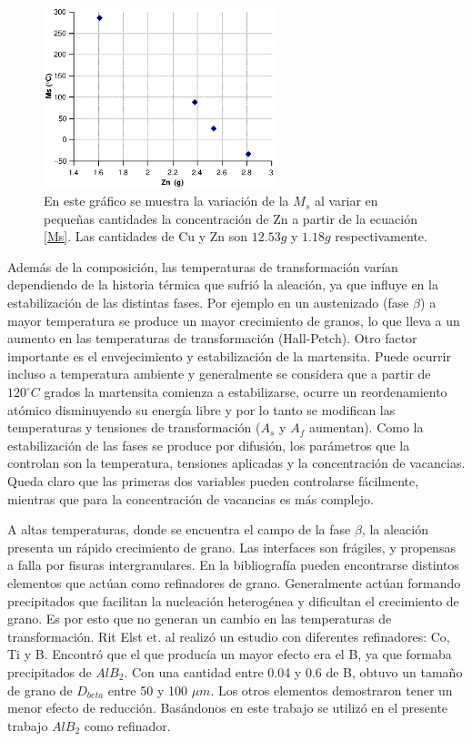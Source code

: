 \documentclass[a4paper,12pt,fleqn,twoside,openany]{book}
\begin{document}
\begin{figure}[h]
 \centering
 \includegraphics[width=0.6\textwidth]{Img/Introduccion/MsZn2.eps}
 \caption{En este gráfico se muestra la variación de la $M_s$ al variar en pequeñas cantidades la concentración de Zn a partir de la ecuación \ref{Ms}. Las cantidades de Cu y Zn son $12.53 g$ y $1.18 g$ respectivamente.}
  
\end{figure}




Además de la composición, las temperaturas de transformación varían dependiendo de la historia térmica que sufrió la aleación, ya que influye en la estabilización 
de las distintas fases. Por ejemplo en un austenizado (fase $\beta$) a mayor temperatura se produce un mayor crecimiento de granos, lo que lleva a un aumento en las 
temperaturas de transformación (Hall-Petch). Otro factor importante es el envejecimiento y estabilización de la martensita. Puede ocurrir incluso a temperatura ambiente y generalmente se considera que a partir de $120^\circ C $ grados la martensita comienza 
a estabilizarse, ocurre un reordenamiento atómico disminuyendo su energía libre y por lo tanto se modifican las temperaturas y tensiones de transformación ($A_s$ y $A_f$ aumentan). Como la estabilización 
de las fases se produce por difusión, los parámetros que la controlan son la temperatura, tensiones aplicadas y la concentración de vacancias. Queda claro que las 
primeras dos variables pueden controlarse fácilmente, mientras que para la concentración de vacancias es más complejo.

A altas temperaturas, donde se encuentra el campo de la fase $\beta$, la aleación presenta un rápido crecimiento de grano. Las interfaces son frágiles, y propensas 
a falla por fisuras intergranulares. En la bibliografía pueden encontrarse distintos elementos que actúan como refinadores de grano. Generalmente actúan formando 
precipitados que facilitan la nucleación heterogénea y dificultan el crecimiento de grano. Es por esto que no generan un cambio en las temperaturas de 
transformación. Rit Elst et. al \cite{ritelst} realizó un estudio con diferentes refinadores: Co, Ti y B. Encontró que el que producía un mayor efecto era el B, 
ya que formaba precipitados de $AlB_{2}$. Con una cantidad entre 0.04 y 0.6 de B, obtuvo un tamaño de grano de $D_{beta}$ entre 50 y 100 $\mu m$. Los otros elementos 
demostraron tener un menor efecto de reducción. Basándonos en este trabajo se utilizó en el presente trabajo $AlB_{2}$ como refinador.
\end{document}
